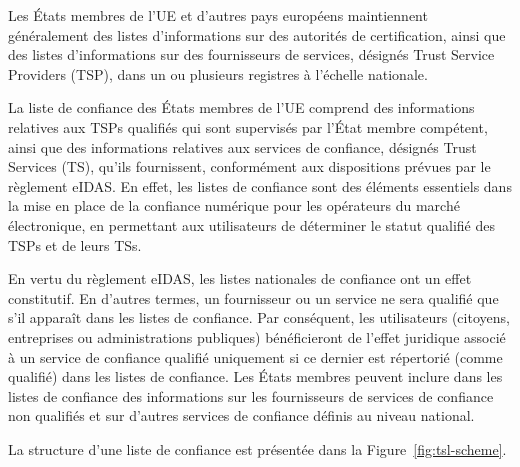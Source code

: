 \documentclass{tnreport}
\begin{document}
Les États membres de l'UE et d'autres pays européens maintiennent généralement des listes d'informations sur des autorités de certification, ainsi que des listes d'informations sur des fournisseurs de services, désignés Trust Service Providers (TSP), dans un ou plusieurs registres à l'échelle nationale.

La liste de confiance des États membres de l'UE comprend des informations relatives aux TSPs qualifiés qui sont supervisés par l'État membre compétent, ainsi que des informations relatives aux services de confiance, désignés Trust Services (TS), qu'ils fournissent, conformément aux dispositions prévues par le règlement eIDAS.
En effet, les listes de confiance sont des éléments essentiels dans la mise en place de la confiance numérique pour les opérateurs du marché électronique, en permettant aux utilisateurs de déterminer le statut qualifié des TSPs et de leurs TSs.

En vertu du règlement eIDAS, les listes nationales de confiance ont un effet constitutif.
En d'autres termes, un fournisseur ou un service ne sera qualifié que s'il apparaît dans les listes de confiance. Par conséquent, les utilisateurs (citoyens, entreprises ou administrations publiques) bénéficieront de l'effet juridique associé à un service de confiance qualifié uniquement si ce dernier est répertorié (comme qualifié) dans les listes de confiance.	
Les États membres peuvent inclure dans les listes de confiance des informations sur les fournisseurs de services de confiance non qualifiés et sur d'autres services de confiance définis au niveau national.

La structure d'une liste de confiance est présentée dans la Figure~\ref{fig:tsl-scheme}.
\end{document}
